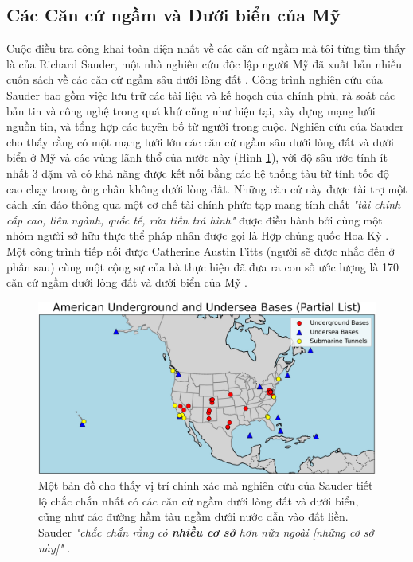 \subsection{Các Căn cứ ngầm và Dưới biển của Mỹ}

Cuộc điều tra công khai toàn diện nhất về các căn cứ ngầm mà tôi từng tìm thấy là của Richard Sauder, một nhà nghiên cứu độc lập người Mỹ đã xuất bản nhiều cuốn sách về các căn cứ ngầm sâu dưới lòng đất \cite{22}. Công trình nghiên cứu của Sauder bao gồm việc lưu trữ các tài liệu và kế hoạch của chính phủ, rà soát các bản tin và công nghệ trong quá khứ cũng như hiện tại, xây dựng mạng lưới nguồn tin, và tổng hợp các tuyên bố từ người trong cuộc. Nghiên cứu của Sauder cho thấy rằng có một mạng lưới lớn các căn cứ ngầm sâu dưới lòng đất và dưới biển ở Mỹ và các vùng lãnh thổ của nước này (Hình \ref{fig:4}), với độ sâu ước tính ít nhất 3 dặm và có khả năng được kết nối bằng các hệ thống tàu từ tính tốc độ cao chạy trong ống chân không dưới lòng đất. Những căn cứ này được tài trợ một cách kín đáo thông qua một cơ chế tài chính phức tạp mang tính chất \textit{"tài chính cấp cao, liên ngành, quốc tế, rửa tiền trá hình"} được điều hành bởi cùng một nhóm người sở hữu thực thể pháp nhân được gọi là Hợp chủng quốc Hoa Kỳ \cite{22}. Một công trình tiếp nối được Catherine Austin Fitts (người sẽ được nhắc đến ở phần sau) cùng một cộng sự của bà thực hiện đã đưa ra con số ước lượng là 170 căn cứ ngầm dưới lòng đất và dưới biển của Mỹ \cite{16,20}.

\begin{figure}[t]
\begin{center}
\includegraphics[width=1\textwidth]{basescrop.png}
\end{center}
   \caption{Một bản đồ cho thấy vị trí chính xác mà nghiên cứu của Sauder tiết lộ chắc chắn nhất có các căn cứ ngầm dưới lòng đất và dưới biển, cũng như các đường hầm tàu ngầm dưới nước dẫn vào đất liền. Sauder \textit{"chắc chắn rằng có \textbf{nhiều cơ sở} hơn nữa ngoài [những cơ sở này]"} \cite{22}.}
   \label{fig:4}
\end{figure}

